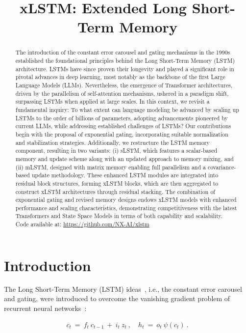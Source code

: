 \title{xLSTM: Extended Long Short-Term Memory}

\begin{abstract}
The introduction of the constant error carousel and gating mechanisms in the 1990s established the foundational principles behind the Long Short-Term Memory (LSTM) architecture. LSTMs have since proven their longevity and played a significant role in pivotal advances in deep learning, most notably as the backbone of the first Large Language Models (LLMs). Nevertheless, the emergence of Transformer architectures, driven by the parallelism of self-attention mechanisms, ushered in a paradigm shift, surpassing LSTMs when applied at large scales. In this context, we revisit a fundamental inquiry: To what extent can language modeling be advanced by scaling up LSTMs to the order of billions of parameters, adopting advancements pioneered by current LLMs, while addressing established challenges of LSTMs? Our contributions begin with the proposal of exponential gating, incorporating suitable normalization and stabilization strategies. Additionally, we restructure the LSTM memory component, resulting in two variants: (i) sLSTM, which features a scalar-based memory and update scheme along with an updated approach to memory mixing, and (ii) mLSTM, designed with matrix memory enabling full parallelism and a covariance-based update methodology. These enhanced LSTM modules are integrated into residual block structures, forming xLSTM blocks, which are then aggregated to construct xLSTM architectures through residual stacking. The combination of exponential gating and revised memory designs endows xLSTM models with enhanced performance and scaling characteristics, demonstrating competitiveness with the latest Transformers and State Space Models in terms of both capability and scalability.\\
Code available at: \url{https://github.com/NX-AI/xlstm}
\end{abstract}

\section{Introduction}
\label{sec:intro}

The Long Short-Term Memory (LSTM) ideas~\citep{Hochreiter:91,Hochreiter:97nips,Hochreiter:97}, i.e., the constant error carousel and gating, were introduced to overcome the vanishing gradient problem of recurrent neural networks~\citep{Hochreiter:91,Hochreiter:00book}:

\begin{align}
\label{eq:lstm_idea}
  c_t \ = \ f_t \ c_{t-1} \ + \ 
          i_t \  z_t \ , \quad  
          h_t \ = \ o_t \ \psi({c_t}) \ . 
\end{align}

